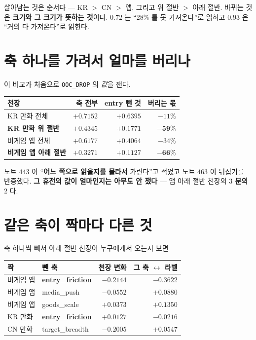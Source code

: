 \documentclass[11pt]{article}
\begin{document}
살아남는 것은 순서다 --- KR $>$ CN $>$ 앱, 그리고 위 절반 $>$ 아래 절반.
바뀌는 것은 \textbf{크기와 그 크기가 뜻하는 것}이다. $0.72$ 는 ``$28\%$ 를
못 가져온다''로 읽히고 $0.93$ 은 ``거의 다 가져온다''로 읽힌다.

\section{축 하나를 가려서 얼마를 버리나}

이 비교가 처음으로 \texttt{OOC\_DROP} 의 \emph{값}을 잰다.

\begin{center}
\begin{tabular}{lrrr}
\hline
천장 & 축 전부 & entry 뺀 것 & 버리는 몫 \\
\hline
KR 만화 전체 & $+0.7152$ & $+0.6395$ & $-11\%$ \\
\textbf{KR 만화 위 절반} & $+0.4345$ & $+0.1771$ & $\mathbf{-59\%}$ \\
비게임 앱 전체 & $+0.6177$ & $+0.4064$ & $-34\%$ \\
\textbf{비게임 앱 아래 절반} & $+0.3271$ & $+0.1127$ & $\mathbf{-66\%}$ \\
\hline
\end{tabular}
\end{center}

노트 $443$ 이 ``\textbf{어느 쪽으로 읽을지를 몰라서} 가린다''고 적었고 노트
$463$ 이 뒤집기를 반증했다. \textbf{그 휴전의 값이 얼마인지는 아무도 안
쟀다} --- 앱 아래 절반 천장의 \textbf{$3$ 분의 $2$} 다.

\section{같은 축이 짝마다 다른 것}

축 하나씩 빼서 아래 절반 천장이 누구에게서 오는지 보면

\begin{center}
\begin{tabular}{llrr}
\hline
짝 & 뺀 축 & 천장 변화 & 그 축 $\leftrightarrow$ 라벨 \\
\hline
비게임 앱 & \textbf{entry\_friction} & $\mathbf{-0.2144}$ & $\mathbf{-0.3622}$ \\
비게임 앱 & media\_push & $-0.0552$ & $+0.0880$ \\
비게임 앱 & goods\_scale & $\mathbf{+0.0373}$ & $+0.1350$ \\
KR 만화 & \textbf{entry\_friction} & $\mathbf{+0.0127}$ & $-0.0216$ \\
CN 만화 & target\_breadth & $-0.2005$ & $+0.0547$ \\
\hline
\end{tabular}
\end{center}
\end{document}
